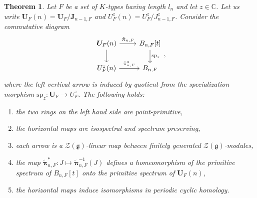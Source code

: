 \documentclass{amsart}
\newtheorem{theorem}{Theorem}[section]
\theoremstyle{definition}
\begin{document}
\begin{theorem}\label{big_theorem}
    Let $F$ be a set of $K$-types having length $l_n$ and let \mbox{$z \in \mathbb{C}$}. Let us write $\bm{U}_F(n) = \bm{U}_F/\bm{J}_{n-1,F}$ and $U^z_F(n) = U^z_F/J^z_{n-1,F}$. Consider the commutative diagram
    \[\begin{tikzcd}
        \bm{U}_F(n) \ar[r, "\tilde{\bm{\pi}}_{n,F}"] \ar[d] & B_{n,F}[t] \ar[d, "\mathrm{sp}_z"]\\
        U^z_F(n) \ar[r, "\tilde{\pi}_{n,F}^z"] & B_{n,F}
    \end{tikzcd},\]
    where the left vertical arrow is induced by quotient from the specialization morphism $\mathrm{sp}_z : \bm{U}_F \to U^z_F$. The following holds:
    \begin{enumerate}
        \item the two rings on the left hand side are point-primitive,
        \item the horizontal maps are isospectral and spectrum preserving,
        \item each arrow is a $\mathcal{Z}(\bm{\mathfrak{g}})$-linear map between finitely generated $\mathcal{Z}(\bm{\mathfrak{g}})$-modules,
        \item the map $\tilde{\bm{\pi}}^*_{n,F} : J \mapsto \tilde{\bm{\pi}}_{n,F}^{-1}(J)$ defines a homeomorphism of the primitive spectrum of $B_{n,F}[t]$ onto the primitive spectrum of $\bm{U}_F(n)$,
        \item the horizontal maps induce isomorphisms in periodic cyclic homology.
    \end{enumerate}
\end{theorem}
\end{document}
